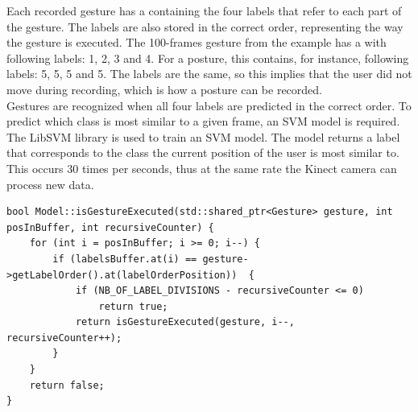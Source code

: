 Each recorded gesture has a  containing the four labels that refer to each part of the gesture. The labels are also stored in the correct order, representing the way the gesture is executed. The 100-frames gesture from the example has a  with following labels: 1, 2, 3 and 4. For a posture, this  contains, for instance, following labels: 5, 5, 5 and 5. The labels are the same, so this implies that the user did not move during recording, which is how a posture can be recorded.\\

Gestures are recognized when all four labels are predicted in the correct order. To predict which class is most similar to a given frame, an SVM model is required. The LibSVM library \cite{LibSVM} is used to train an SVM model. The model returns a label that corresponds to the class the current position of the user is most similar to. This occurs 30 times per seconds, thus at the same rate the Kinect camera can process new data.\\

\begin{lstlisting}[caption=method to verify if given gesture is executed, label=code_gesture_executed]
bool Model::isGestureExecuted(std::shared_ptr<Gesture> gesture, int posInBuffer, int recursiveCounter) {
	for (int i = posInBuffer; i >= 0; i--) {
		if (labelsBuffer.at(i) == gesture->getLabelOrder().at(labelOrderPosition))	{
			if (NB_OF_LABEL_DIVISIONS - recursiveCounter <= 0)
				return true;
			return isGestureExecuted(gesture, i--, recursiveCounter++);
		}
	}
	return false;
}
\end{lstlisting}